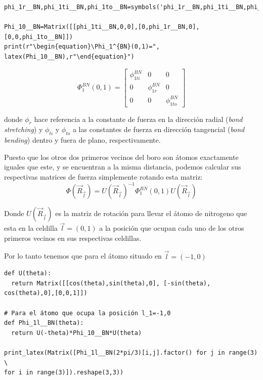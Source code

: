 \documentclass[12pt,a4paper]{article}
\begin{document}
\begin{verbatim}
phi_1r__BN,phi_1ti__BN,phi_1to__BN=symbols('phi_1r__BN,phi_1ti__BN,phi_1to__BN')

Phi_10__BN=Matrix([[phi_1ti__BN,0,0],[0,phi_1r__BN,0],[0,0,phi_1to__BN]])
print(r"\begin{equation}\Phi_1^{BN}(0,1)=", latex(Phi_10__BN),r"\end{equation}")
\end{verbatim}

\begin{equation}\Phi_1^{BN}(0,1)= \left[\begin{matrix}\phi^{BN}_{1ti} & 0 & 0\\0 & \phi^{BN}_{1r} & 0\\0 & 0 & \phi^{BN}_{1to}\end{matrix}\right] \end{equation}
\vspace{0.7cm}



donde \(\phi_r\) hace referencia a la constante de fuerza en la dirección radial (\emph{bond stretching}) y \(\phi_{ti}\) y \(\phi_{to}\) a las constantes de fuerza en dirección tangencial (\emph{bond bending}) dentro y fuera de plano, respectivamente.

Puesto que los otros dos primeros vecinos del boro son átomos exactamente iguales que este, y se encuentran a la misma distancia, podemos calcular sus respectivas matrices de fuerza simplemente rotando esta matriz:
\begin{equation}
\label{eq:2}
\Phi(\vec R_{\vec l})=U(\vec R_{\vec l})^{-1}\Phi^{BN}_{1}(0,1)U(\vec R_{\vec l})
\end{equation}

Donde \(U(\vec R_{\vec l})\) es la matriz de rotación para llevar el átomo de nitrogeno que esta en la celdilla \(\vec l=(0, 1)\) a la posición que ocupan cada uno de los otros primeros vecinos en sus respectivas celdillas.

Por lo tanto tenemos que para el átomo situado en \(\vec l=(-1,0)\)
\begin{verbatim}
def U(theta):
  return Matrix([[cos(theta),sin(theta),0], [-sin(theta), cos(theta),0],[0,0,1]])

# Para el átomo que ocupa la posición l_1=-1,0
def Phi_1l__BN(theta):
  return U(-theta)*Phi_10__BN*U(theta)

print_latex(Matrix([Phi_1l__BN(2*pi/3)[i,j].factor() for j in range(3) \
for i in range(3)]).reshape(3,3))
\end{verbatim}
\end{document}
